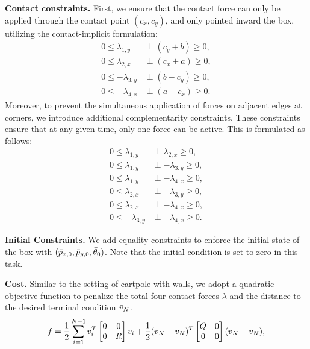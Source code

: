 \textbf{Contact constraints. }
First, we ensure that the contact force can only be applied through the contact point $(c_x,c_y)$, and only pointed inward the box, utilizing the contact-implicit formulation:
\begin{align}
 0 \leq \lambda_{1,y} &\perp \left(c_y+b\right)\geq 0, \\
 0 \leq \lambda_{2,x} &\perp \left(c_x+a\right)\geq 0,\\
  0 \leq -\lambda_{3,y} &\perp \left(b-c_y\right)\geq 0,\\ 0 \leq -\lambda_{4,x} &\perp \left(a-c_x\right)\geq 0.
\end{align}
Moreover, to prevent the simultaneous application of forces on adjacent edges at corners, we introduce additional complementarity constraints. These constraints ensure that at any given time, only one force can be active. This is formulated as follows:
\begin{align}
 0 \leq \lambda_{1,y} &\perp \lambda_{2,x}\geq 0, \\
  0 \leq \lambda_{1,y} &\perp -\lambda_{3,y}\geq 0, \\
   0 \leq \lambda_{1,y} &\perp -\lambda_{4,x}\geq 0,\\
    0 \leq \lambda_{2,x} &\perp -\lambda_{3,y}\geq 0,\\
     0 \leq \lambda_{2,x} &\perp -\lambda_{4,x}\geq 0,\\
      0 \leq -\lambda_{3,y} &\perp -\lambda_{4,x}\geq 0.
\end{align}

\textbf{Initial Constraints.}
We add equality constraints to enforce the initial state of the box with $(\Bar{p}_{x,0}, \Bar{p}_{y,0},\Bar{\theta}_{0})$. Note that the initial condition is set to zero in this task.

\textbf{Cost.}
Similar to the setting of cartpole with walls, we adopt a quadratic objective function to penalize the total four contact forces $\lambda$ and the distance to the desired terminal condition $\Bar{v}_N$.
\begin{equation}
    f = \frac{1}{2} \sum_{i=1}^{N-1} v_i^T \begin{bmatrix} 0 & 0 \\ 0 & R \end{bmatrix} v_i + \frac{1}{2} (v_N-\Bar{v}_N)^T \begin{bmatrix} Q & 0 \\ 0 & 0 \end{bmatrix} (v_N-\Bar{v}_N),
\end{equation}

